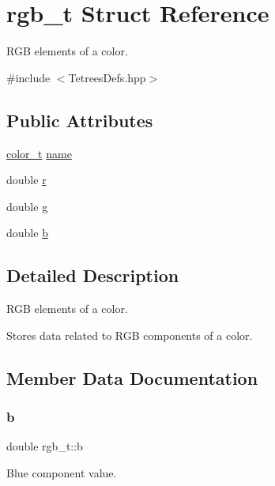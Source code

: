 \hypertarget{structrgb__t}{}\section{rgb\+\_\+t Struct Reference}
\label{structrgb__t}


R\+GB elements of a color.  




{\ttfamily \#include $<$Tetrees\+Defs.\+hpp$>$}

\subsection*{Public Attributes}
\begin{DoxyCompactItemize}
\item 
\hyperlink{TetreesDefs_8hpp_a8ba5fbce2446135735693ab60c896bbd}{color\+\_\+t} \hyperlink{structrgb__t_a98fbae1e6897105536340238b9660ba5}{name}
\item 
double \hyperlink{structrgb__t_a89e46e1937cafe0683023100a5e1915a}{r}
\item 
double \hyperlink{structrgb__t_a626bf50c035e97070dcd72f3717ee64f}{g}
\item 
double \hyperlink{structrgb__t_ac93baee02597b8f626911b7ec88e5dec}{b}
\end{DoxyCompactItemize}


\subsection{Detailed Description}
R\+GB elements of a color. 

Stores data related to R\+GB components of a color. 

\subsection{Member Data Documentation}
\mbox{\label{structrgb__t_ac93baee02597b8f626911b7ec88e5dec}} 
\subsubsection{\texorpdfstring{b}{b}}
{\footnotesize\ttfamily double rgb\+\_\+t\+::b}

Blue component value. \mbox{\label{structrgb__t_a626bf50c035e97070dcd72f3717ee64f}} 
